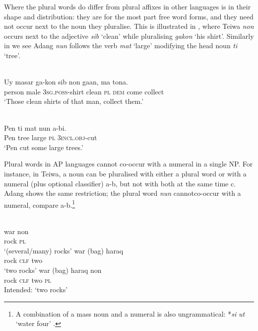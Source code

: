 Where the plural words do differ from plural affixes in other languages is in their shape and distribution: they are for the most part free word forms, and they need not occur next to the noun they pluralise. This is illustrated in , where Teiwa \textit{non} occurs next to the adjective \textit{sib} `clean' while pluralising \textit{gakon} `his shirt'. Similarly in  we see Adang \textit{nun} follows the verb \textit{mat}\textit{{\textepsilon}} `large' modifying the head noun \textit{ti} `tree'.


\ea%
 \\
\label{ex:9:8}
\gll  Uy masar ga-kon  sib non ga{{\textglotstop}}{an,} ma {tona}{{\textglotstop}}{.}\\
   person male \textsc{3sg.poss}-shirt clean \textsc{pl} \textsc{dem} come collect\\
\glt `Those clean shirts of that man, collect them.'
\z







\ea%
 \\
\label{ex:9:9}
\gll Pen ti {mat}{{\textepsilon}} nun {\textglotstop}a-b{{\textopeno}}{{\textglotstop}}{{\textopeno}}{i.} \\
   Pen tree large \textsc{pl} \textsc{3incl.obj}-cut \\
\glt `Pen cut some large trees.'
\z






Plural words in AP languages cannot co-occur with a numeral in a single NP. For instance, in Teiwa, a noun can be pluralised with either a plural word or with a numeral (plus optional classifier) a-b, but not with both at the same time c. Adang shows the same restriction; the plural word \textit{nun} cannotco-occur with a numeral, compare a-b.\footnote{  A combination of a mass noun and a numeral is also ungrammatical: *\textit{s}\textit{{\textepsilon}}\textit{i} \textit{ut} `water four' \citep[296]{Haan2001}.}


\ea%
\label{ex:9:10}
 \\
\ea
\gll  war non\\
   rock \textsc{pl}  \\
\glt `(several/many) rocks'
\ex
\gll war (bag) {haraq}\\
 rock \textsc{clf} two  \\
\glt   `two rocks'
\ex
\gll *war (bag) haraq non \\
 rock \textsc{clf} two \textsc{pl} \\
 \glt Intended: `two rocks'
\z
\z



